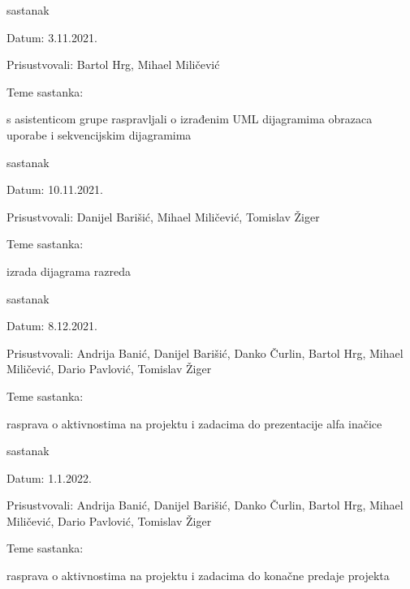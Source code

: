 \begin{packed_enum}
			\item  sastanak
			\item[] \begin{packed_item}
				\item Datum: 3.11.2021.
				\item Prisustvovali: Bartol Hrg, Mihael Miličević
				\item Teme sastanka:
				\begin{packed_item}
					\item  s asistenticom grupe raspravljali o izrađenim UML dijagramima obrazaca uporabe i sekvencijskim dijagramima
				\end{packed_item}
			\end{packed_item}
			
			\item  sastanak
			\item[] \begin{packed_item}
				\item Datum: 10.11.2021.
				\item Prisustvovali: Danijel Barišić, Mihael Miličević, Tomislav Žiger
				\item Teme sastanka:
				\begin{packed_item}
					\item  izrada dijagrama razreda
				\end{packed_item}
			\end{packed_item}
			
			\item  sastanak
			\item[] \begin{packed_item}
				\item Datum: 8.12.2021.
				\item Prisustvovali: Andrija Banić, Danijel Barišić, Danko Čurlin, Bartol Hrg, Mihael Miličević, Dario Pavlović, Tomislav Žiger
				\item Teme sastanka:
				\begin{packed_item}
					\item  rasprava o aktivnostima na projektu i zadacima do prezentacije alfa inačice
				\end{packed_item}
			\end{packed_item}
			
			
			\item  sastanak
			\item[] \begin{packed_item}
				\item Datum: 1.1.2022.
				\item Prisustvovali: Andrija Banić, Danijel Barišić, Danko Čurlin, Bartol Hrg, Mihael Miličević, Dario Pavlović, Tomislav Žiger
				\item Teme sastanka:
				\begin{packed_item}
					\item  rasprava o aktivnostima na projektu i zadacima do konačne predaje projekta
				\end{packed_item}
			\end{packed_item}
			
			
		\end{packed_enum}
		
